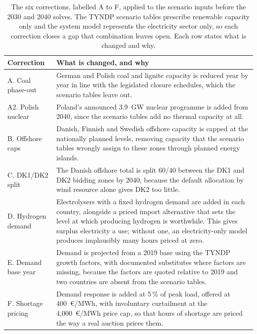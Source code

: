 \begin{table}[H]
\centering
\small
\caption{The six corrections, labelled A to F, applied to the scenario inputs
before the 2030 and 2040 solves. The TYNDP scenario tables prescribe renewable
capacity only and the system model represents the electricity sector only, so
each correction closes a gap that combination leaves open. Each row states
what is changed and why.}
\label{tab:corrections}
\begin{tabular}{l >{\raggedright\arraybackslash}p{10.8cm}}
\toprule
\textbf{Correction} & \textbf{What is changed, and why} \\
\midrule
A. Coal phase-out & German and Polish coal and lignite capacity is reduced
year by year in line with the legislated closure schedules, which the scenario
tables leave out. \\
\addlinespace
A2. Polish nuclear & Poland's announced 3.9~GW nuclear programme is added from
2040, since the scenario tables add no thermal capacity at all. \\
\addlinespace
B. Offshore caps & Danish, Finnish and Swedish offshore capacity is capped at
the nationally planned levels, removing capacity that the scenario tables
wrongly assign to these zones through planned energy islands. \\
\addlinespace
C. DK1/DK2 split & The Danish offshore total is split 60/40 between the DK1
and DK2 bidding zones by 2040, because the default allocation by wind resource
alone gives DK2 too little. \\
\addlinespace
D. Hydrogen demand & Electrolysers with a fixed hydrogen demand are added in
each country, alongside a priced import alternative that sets the level at
which producing hydrogen is worthwhile. This gives surplus electricity a use;
without one, an electricity-only model produces implausibly many hours priced
at zero. \\
\addlinespace
E. Demand base year & Demand is projected from a 2019 base using the TYNDP
growth factors, with documented substitutes where factors are missing, because
the factors are quoted relative to 2019 and two countries are absent from the
scenario tables. \\
\addlinespace
F. Shortage pricing & Demand response is added at 5\,\% of peak load, offered
at 400~\euro/MWh, with involuntary curtailment at the 4{,}000~\euro/MWh price
cap, so that hours of shortage are priced the way a real auction prices them. \\
\bottomrule
\end{tabular}
\end{table}
